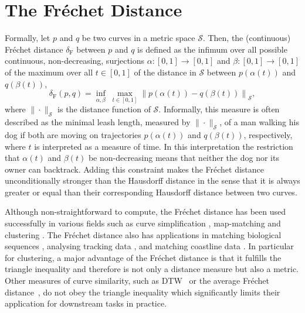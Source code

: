 \section{The Fr\'echet Distance}
\label{sec:frechet}
Formally, let $p$ and $q$ be two curves in a metric space $\mathcal{S}$.
Then, the (continuous) Fr\'echet distance $\delta_\mathrm{F}$ between $p$ and $q$ is defined as the infimum over all possible continuous, non-decreasing, surjections $\alpha: [0, 1] \to [0, 1]$ and $\beta: [0, 1] \to [0, 1]$ of the maximum over all $t \in [0, 1]$ of the distance in $\mathcal{S}$ between $p(\alpha(t))$ and $q(\beta(t))$,
\begin{equation*}
    \delta_\mathrm{F}(p, q) = \inf_{\alpha,\beta} \; \max_{t \in [0, 1]} \left\| p(\alpha(t)) - q(\beta(t)) \right\|_\mathcal{S},
\end{equation*}
where $\| \cdot \|_\mathcal{S}$ is the distance function of $\mathcal{S}$.
Informally, this measure is often described as the minimal leash length, measured by $\| \cdot \|_\mathcal{S}$, of a man walking his dog if both are moving on trajectories $p(\alpha(t))$ and $q(\beta(t))$, respectively, where $t$ is interpreted as a measure of time.
In this interpretation the restriction that $\alpha(t)$ and $\beta(t)$ be non-decreasing means that neither the dog nor its owner can backtrack.
Adding this constraint makes the Fr\'echet distance unconditionally stronger than the Hausdorff distance in the sense that it is always greater or equal than their corresponding Hausdorff distance between two curves.

Although non-straightforward to compute, the Fr\'echet distance has been used successfully in various fields such as curve simplification \citep{agarwal05,bereg08,kreveld18,kerkhof19}, map-matching \citep{alt03a,driemel12,sharma17} and clustering \citep{buchin08b,besse16,buchin19b,buchin19c}.
The Fr\'echet distance also has applications in matching biological sequences \citep{wylie12}, analysing tracking data \citep{brakatsoulas05,buchin08a}, and matching coastline data \citep{mascret06}.
In particular for clustering, a major advantage of the Fr\'echet distance is that it fulfills the triangle inequality and therefore is not only a distance measure but also a metric. 
Other measures of curve similarity, such as DTW~\citep{vintsyuk68,sankoff83} or the average Fr\'echet distance~\citep{brakatsoulas05}, do not obey the triangle inequality which significantly limits their application for downstream tasks in practice.

